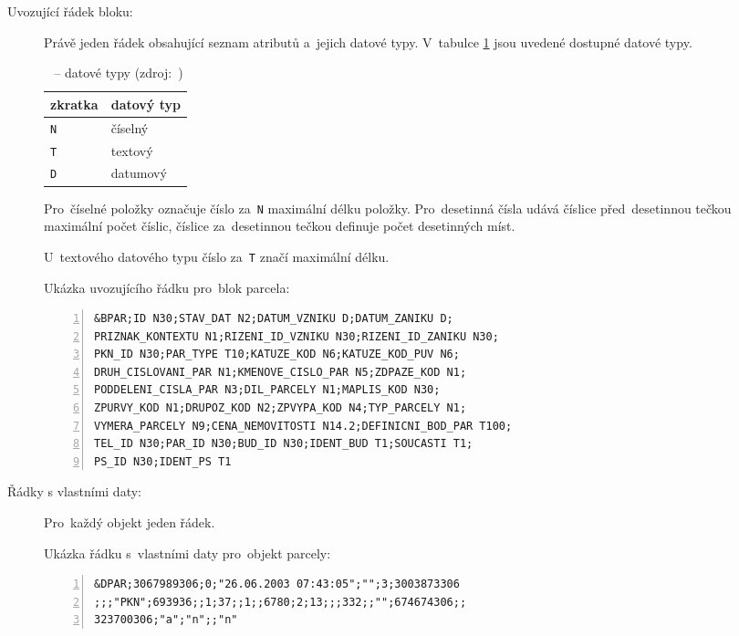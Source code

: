 \begin{description}
	\item[Uvozující řádek bloku:] Právě jeden řádek obsahující
seznam atributů a~jejich datové typy. V~tabulce \ref{tab:datove_typy}
jsou uvedené dostupné datové typy.

\begin{table}[H]
    \begin{tabular}{|l|l|} \hline zkratka & datový typ \\ \hline
\hline \texttt{N} & číselný \\ \hline \texttt{T} & textový \\ \hline
\texttt{D} & datumový \\ \hline
    \end{tabular} \centering
    \caption[~– datové typy]{~– datové typy (zdroj:~\citep{struktura_vfk})}
    \label{tab:datove_typy}
\end{table}

Pro~číselné položky označuje číslo za~\texttt{N} maximální délku
položky. Pro~desetinná čísla udává číslice před~desetinnou tečkou
maximální počet číslic, číslice za~desetinnou tečkou definuje počet
desetinných míst.

U~textového datového typu číslo za~\texttt{T} značí maximální délku.

Ukázka uvozujícího řádku pro~blok parcela:

	\begin{lstlisting}[basicstyle=\footnotesize\ttfamily,
            backgroundcolor = \color{light-gray}, numbers=left]
&BPAR;ID N30;STAV_DAT N2;DATUM_VZNIKU D;DATUM_ZANIKU D;
PRIZNAK_KONTEXTU N1;RIZENI_ID_VZNIKU N30;RIZENI_ID_ZANIKU N30;
PKN_ID N30;PAR_TYPE T10;KATUZE_KOD N6;KATUZE_KOD_PUV N6;
DRUH_CISLOVANI_PAR N1;KMENOVE_CISLO_PAR N5;ZDPAZE_KOD N1;
PODDELENI_CISLA_PAR N3;DIL_PARCELY N1;MAPLIS_KOD N30;
ZPURVY_KOD N1;DRUPOZ_KOD N2;ZPVYPA_KOD N4;TYP_PARCELY N1;
VYMERA_PARCELY N9;CENA_NEMOVITOSTI N14.2;DEFINICNI_BOD_PAR T100;
TEL_ID N30;PAR_ID N30;BUD_ID N30;IDENT_BUD T1;SOUCASTI T1;
PS_ID N30;IDENT_PS T1
	\end{lstlisting}

	\item[Řádky s vlastními daty:] Pro~každý objekt jeden řádek.

Ukázka řádku s~vlastními daty pro~objekt parcely:
	
	\begin{lstlisting}[basicstyle=\footnotesize\ttfamily,
backgroundcolor = \color{light-gray}, numbers=left]
&DPAR;3067989306;0;"26.06.2003 07:43:05";"";3;3003873306
;;;"PKN";693936;;1;37;;1;;6780;2;13;;;332;;"";674674306;;
323700306;"a";"n";;"n"
	\end{lstlisting}
\end{description}

